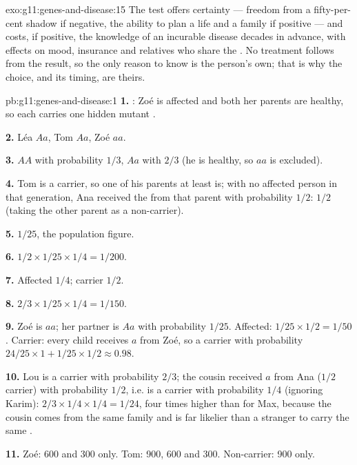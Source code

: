 \begin{solution}{exo:g11:genes-and-disease:15}
The test offers certainty --- freedom from a fifty-per-cent shadow if
negative, the ability to plan a life and a family if positive --- and
costs, if positive, the knowledge of an incurable disease decades in
advance, with effects on mood, insurance and relatives who share the
. No treatment follows from the result, so the only reason to
know is the person's own; that is why the choice, and its timing, are
theirs.
\end{solution}

\begin{solution}{pb:g11:genes-and-disease:1}
\textbf{1.} : Zoé is affected and both her parents are
healthy, so each carries one hidden mutant .

\textbf{2.} Léa $Aa$, Tom $Aa$, Zoé $aa$.

\textbf{3.} $AA$ with probability $1/3$, $Aa$ with $2/3$ (he is
healthy, so $aa$ is excluded).

\textbf{4.} Tom is a carrier, so one of his parents at least is; with
no affected person in that generation, Ana received the  from
that parent with probability $1/2$: $1/2$ (taking the other parent as
a non-carrier).

\textbf{5.} $1/25$, the population figure.

\textbf{6.} $1/2 \times 1/25 \times 1/4 = 1/200$.

\textbf{7.} Affected $1/4$; carrier $1/2$.

\textbf{8.} $2/3 \times 1/25 \times 1/4 = 1/150$.

\textbf{9.} Zoé is $aa$; her partner is $Aa$ with probability $1/25$.
Affected: $1/25 \times 1/2 = 1/50$. Carrier: every child receives $a$
from Zoé, so a carrier with probability $24/25 \times 1 + 1/25 \times
1/2 \approx 0.98$.

\textbf{10.} Lou is a carrier with probability $2/3$; the cousin
received $a$ from Ana ($1/2$ carrier) with probability $1/2$, i.e. is a
carrier with probability $1/4$ (ignoring Karim): $2/3 \times 1/4
\times 1/4 = 1/24$, four times higher than for Max, because the cousin
comes from the same family and is far likelier than a stranger to
carry the same .

\textbf{11.} Zoé: 600 and 300 only. Tom: 900, 600 and 300. Non-carrier:
900 only.


\end{solution}
